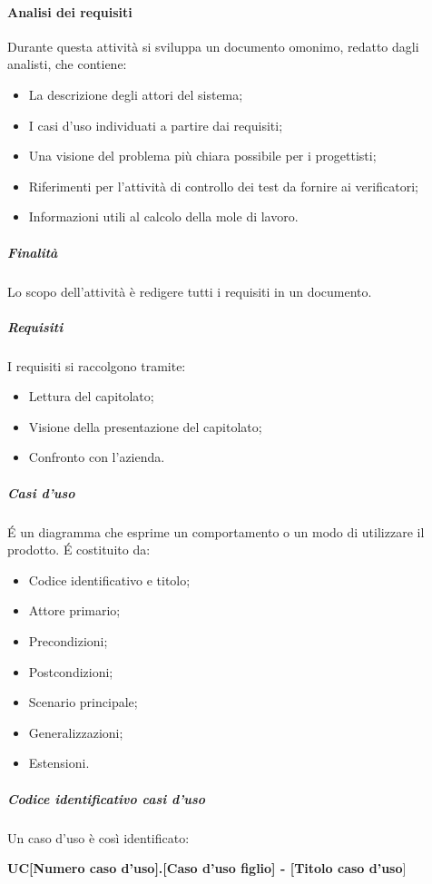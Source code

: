 \paragraph{Analisi dei requisiti}
Durante questa attività si sviluppa un documento omonimo, redatto dagli analisti, che contiene:
\begin{itemize}
\item La descrizione degli attori del sistema;
\item I casi d'uso individuati a partire dai requisiti;
\item Una visione del problema più chiara possibile per i progettisti;
\item Riferimenti per l'attività di controllo dei test da fornire ai verificatori;
\item Informazioni utili al calcolo della mole di lavoro.
\end{itemize}
\subparagraph{Finalità}
Lo scopo dell'attività è redigere tutti i requisiti in un documento.
\subparagraph{Requisiti}
I requisiti si raccolgono tramite:
\begin{itemize}
\item Lettura del capitolato;
\item Visione della presentazione del capitolato;
\item Confronto con l'azienda.
\end{itemize}
\subparagraph{Casi d'uso}
\'E un diagramma che esprime un comportamento o un modo di utilizzare il prodotto. \'E costituito da:
\begin{itemize}
\item Codice identificativo e titolo;
\item Attore primario;
\item Precondizioni;
\item Postcondizioni;
\item Scenario principale;
\item Generalizzazioni;
\item Estensioni.
\end{itemize}
\subparagraph{Codice identificativo casi d'uso}
Un caso d'uso è così identificato:

\begin{center}
\textbf{UC[Numero caso d'uso].[Caso d'uso figlio] - [Titolo caso d'uso}]
\end{center}
		
